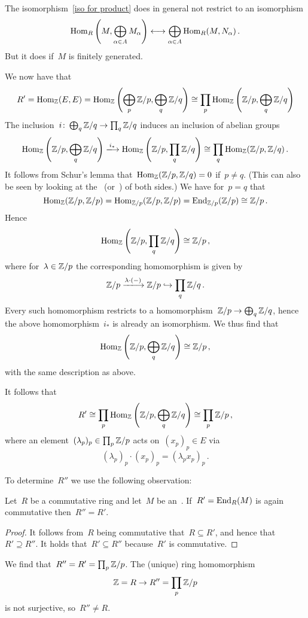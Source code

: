 \begin{warning}
  The isomorphism~\eqref{iso for product} does in general not restrict to an isomorphism
  \[
      \operatorname{Hom}_R\left( M, \bigoplus_{\alpha \in A} M_\alpha \right)
    \longleftrightarrow
      \bigoplus_{\alpha \in A} \operatorname{Hom}_R(M, N_\alpha) \,.
  \]
  But it does if~$M$ is finitely generated.
\end{warning}

We now have that
\begin{align*}
        R'
  =     \operatorname{Hom}_{\mathbb{Z}}(E, E)
  =     \operatorname{Hom}_{\mathbb{Z}}\left( \bigoplus_p \mathbb{Z}/p , \bigoplus_q \mathbb{Z}/q \right)
  \cong \prod_p \operatorname{Hom}_{\mathbb{Z}} \left( \mathbb{Z}/p, \bigoplus_q \mathbb{Z}/q \right)
\end{align*}
The inclusion~$i \colon \bigoplus_q \mathbb{Z}/q \to \prod_q \mathbb{Z}/q$ induces an inclusion of abelian groups
\[
                \Hom_\Integer \left( \Integer/p, \bigoplus_q \Integer/q \right)
  \xlongto{i_*} \Hom_\Integer \left( \Integer/p, \prod_q \Integer/q \right)
  \cong         \prod_q \Hom_\Integer( \Integer/p, \Integer/q ) \,.
\]
It follows from Schur’s lemma that~$\operatorname{Hom}_{\mathbb{Z}}(\mathbb{Z}/p, \mathbb{Z}/q) = 0$ if~$p \neq q$.
(This can also be seen by looking at the~ (or~) of both sides.)
We have for~$p = q$ that
\[
        \operatorname{Hom}_{\mathbb{Z}}( \mathbb{Z}/p, \mathbb{Z}/p )
  =     \operatorname{Hom}_{\mathbb{Z}/p}( \mathbb{Z}/p, \mathbb{Z}/p )
  =     \operatorname{End}_{\mathbb{Z}/p}( \mathbb{Z}/p )
  \cong \mathbb{Z}/p \,.
\]
Hence
\[
        \operatorname{Hom}_{\mathbb{Z}} \left( \mathbb{Z}/p, \prod_q \mathbb{Z}/q \right)
  \cong \mathbb{Z}/p \,,
\]
where for~$\lambda \in \mathbb{Z}/p$ the corresponding homomorphism is given by
\[
  \Integer/p
  \xlongto{\lambda \cdot (-)}
  \Integer/p
  \inclusion
  \prod_q \Integer/q \,.
\]
Every such homomorphism restricts to a homomorphism~$\mathbb{Z}/p \to \bigoplus_q \mathbb{Z}/q$, hence the above homomorphism~$i_*$ is already an isomorphism.
We thus find that
\[
        \operatorname{Hom}_{\mathbb{Z}} \left( \mathbb{Z}/p, \bigoplus_q \mathbb{Z}/q \right)
  \cong \mathbb{Z}/p \,,
\]
with the same description as above.

It follows that
\[
        R'
  \cong \prod_p \operatorname{Hom}_{\mathbb{Z}} \left( \mathbb{Z}/p, \bigoplus_q \mathbb{Z}/q \right)
  \cong \prod_p \mathbb{Z}/p \,,
\]
where an element~$(\lambda_p)_p \in \prod_p \mathbb{Z}/p$ acts on~$(x_p)_p \in E$ via
\[
    (\lambda_p)_p \cdot (x_p)_p
  = (\lambda_p x_p)_p \,.
\]

To determine~$R''$ we use the following observation:

\begin{lemma}
  Let~$R$ be a commutative ring and let~$M$ be an~{}.
  If~$R' = \operatorname{End}_R(M)$ is again commutative then~$R'' = R'$.
\end{lemma}

\begin{proof}
  It follows from~$R$ being commutative that~$R \subseteq R'$, and hence that~$R' \supseteq R''$.
  It holds that~$R' \subseteq R''$ because~$R'$ is commutative.
\end{proof}

We find that~$R'' = R' = \prod_p \mathbb{Z}/p$.
The (unique) ring homomorphism
\[
      \mathbb{Z}
  =   R
  \to R''
  =   \prod_p \mathbb{Z}/p
\]
is not surjective, so~$R'' \neq R$.



